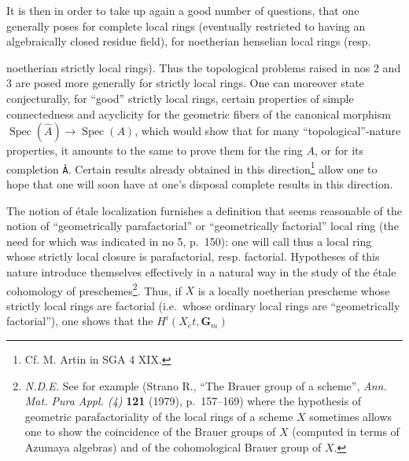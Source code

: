 \documentclass[
]{article}
\begin{document}
It is then in order to take up again a good number of questions, that
one generally poses for complete local rings (eventually restricted to
having an algebraically closed residue field), for noetherian henselian
local rings (resp.

noetherian strictly local rings). Thus the topological problems raised
in nos 2 and 3 are posed more generally for strictly local rings. One
can moreover state conjecturally, for ``good'' strictly local rings,
certain properties of simple connectedness and acyclicity for the
geometric fibers of the canonical morphism
\(\operatorname{Spec}(\hat{A}) \to \operatorname{Spec}(A)\), which would
show that for many ``topological''-nature properties, it amounts to the
same to prove them for the ring \(A\), or for its completion \texttt{Â}.
Certain results already obtained in this direction\footnote{Cf. M. Artin
  in SGA 4 XIX.} allow one to hope that one will soon have at one's
disposal complete results in this direction.

The notion of étale localization furnishes a definition that seems
reasonable of the notion of ``geometrically parafactorial'' or
``geometrically factorial'' local ring (the need for which was indicated
in no 5, p.~150): one will call thus a local ring whose strictly local
closure is parafactorial, resp. factorial. Hypotheses of this nature
introduce themselves effectively in a natural way in the study of the
étale cohomology of preschemes\footnote{\emph{N.D.E.} See for example
  (Strano R., ``The Brauer group of a scheme'', \emph{Ann. Mat. Pura
  Appl. (4)} \textbf{121} (1979), p.~157--169) where the hypothesis of
  geometric parafactoriality of the local rings of a scheme \(X\)
  sometimes allows one to show the coincidence of the Brauer groups of
  \(X\) (computed in terms of Azumaya algebras) and of the cohomological
  Brauer group of \(X\).}. Thus, if \(X\) is a locally noetherian
prescheme whose strictly local rings are factorial (i.e.~whose ordinary
local rings are ``geometrically factorial''), one shows that the
\(H^{i}(X_{\acute{e}}t, \mathbf{G}_{m})\)
\end{document}
